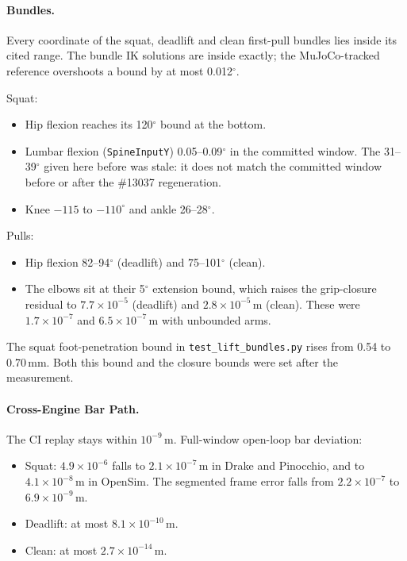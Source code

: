 \documentclass[11pt,a4paper]{article}
\begin{document}
\paragraph{Bundles.} Every coordinate of the squat, deadlift and clean
first-pull bundles lies inside its cited range. The bundle IK solutions are
inside exactly; the MuJoCo-tracked reference overshoots a bound by at most
0.012$^\circ$.

Squat:
\begin{itemize}[nosep]
\item Hip flexion reaches its 120$^\circ$ bound at the bottom.
\item Lumbar flexion (\texttt{SpineInputY}) 0.05--0.09$^\circ$ in the committed
  window. The 31--39$^\circ$ given here before was stale: it does not match
  the committed window before or after the \#13037 regeneration.
\item Knee $-115$ to $-110^\circ$ and ankle 26--28$^\circ$.
\end{itemize}

Pulls:
\begin{itemize}[nosep]
\item Hip flexion 82--94$^\circ$ (deadlift) and 75--101$^\circ$ (clean).
\item The elbows sit at their 5$^\circ$ extension bound, which raises the
  grip-closure residual to $7.7\times10^{-5}$ (deadlift) and
  $2.8\times10^{-5}$\,m (clean). These were $1.7\times10^{-7}$ and
  $6.5\times10^{-7}$\,m with unbounded arms.
\end{itemize}

The squat foot-penetration bound in \texttt{test\_lift\_bundles.py} rises from
0.54 to 0.70\,mm. Both this bound and the closure bounds were set after the
measurement.

\paragraph{Cross-Engine Bar Path.} The CI replay stays within $10^{-9}$\,m.
Full-window open-loop bar deviation:
\begin{itemize}[nosep]
\item Squat: $4.9\times10^{-6}$ falls to $2.1\times10^{-7}$\,m in Drake and
  Pinocchio, and to $4.1\times10^{-8}$\,m in OpenSim. The segmented frame
  error falls from $2.2\times10^{-7}$ to $6.9\times10^{-9}$\,m.
\item Deadlift: at most $8.1\times10^{-10}$\,m.
\item Clean: at most $2.7\times10^{-14}$\,m.
\end{itemize}
\end{document}
